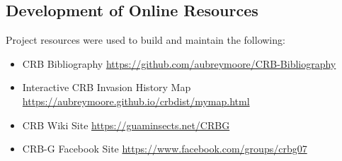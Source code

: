 \documentclass[12pt,
letterpaper,english,bibliography=totocnumbered, abstract=on]{scrartcl}
\begin{document}
\subsection{Development of Online Resources}

Project resources were used to build and maintain the following:
\begin{itemize}
	\item CRB Bibliography \url{https://github.com/aubreymoore/CRB-Bibliography}
	\item Interactive CRB Invasion History Map	\url{https://aubreymoore.github.io/crbdist/mymap.html}
	\item CRB Wiki Site \url{https://guaminsects.net/CRBG}
	\item CRB-G Facebook Site \url{https://www.facebook.com/groups/crbg07} 
\end{itemize}

\newpage

%
%
%
%
%
%
%
%
%
%
%
%
%
%
\clearpage
\printbibliography[heading=bibintoc]
\end{document}
